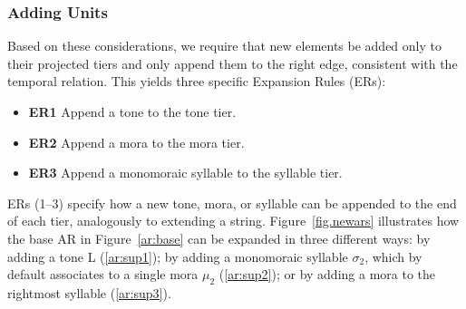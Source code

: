 \documentclass{CUP-JNL-PHO}%
\theoremstyle{definition}
\numberwithin{equation}{section}
\theoremstyle{definition}
\begin{document}
\subsubsection{Adding Units}
Based on these considerations, we require that new elements be added 
only to their projected tiers and only append them to the right 
edge, consistent with the temporal relation. This yields three specific
Expansion Rules (ERs):
\begin{itemize}
	\item \textbf{ER1} Append a tone to the tone tier.
	\item \textbf{ER2} Append a mora to the mora tier.
	\item \textbf{ER3} Append a monomoraic syllable to the syllable tier.
\end{itemize}
ERs (1–3) specify how a new tone, mora, or syllable can be appended 
to the end of each tier, analogously to extending a string.
Figure~\ref{fig.newars} illustrates how the base AR in 
Figure~\ref{ar:base} can be expanded in three different ways: by 
adding a tone L (\ref{ar:sup1}); by adding a monomoraic syllable $\sigma_2$, 
which by default associates to a single mora $\mu_2$ (\ref{ar:sup2}); 
or by adding a mora to the rightmost syllable (\ref{ar:sup3}).
\end{document}
